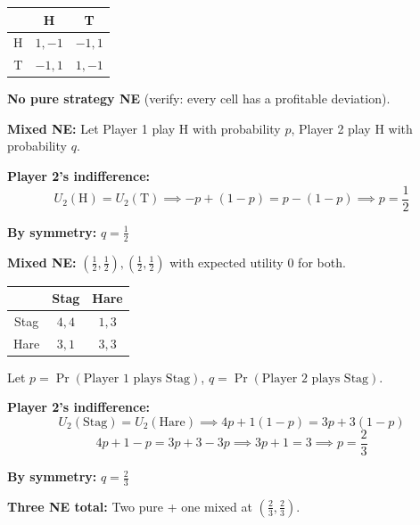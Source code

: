 \begin{exbox}
\begin{center}
\renewcommand{\arraystretch}{1.2}
\begin{tabular}{@{} c | c c @{}}
 & H & T \\
\midrule
H & $1, -1$ & $-1, 1$ \\
T & $-1, 1$ & $1, -1$ \\
\end{tabular}
\end{center}

\textbf{No pure strategy NE} (verify: every cell has a profitable deviation).

\textbf{Mixed NE:} Let Player 1 play H with probability $p$, Player 2 play H with probability $q$.

\textbf{Player 2's indifference:}
\[
U_2(\text{H}) = U_2(\text{T}) \implies -p + (1-p) = p - (1-p) \implies p = \frac{1}{2}
\]

\textbf{By symmetry:} $q = \frac{1}{2}$

\textbf{Mixed NE:} $\left(\frac{1}{2}, \frac{1}{2}\right), \left(\frac{1}{2}, \frac{1}{2}\right)$ with expected utility $0$ for both.
\end{exbox}

\begin{exbox}
\begin{center}
\renewcommand{\arraystretch}{1.2}
\begin{tabular}{@{} c | c c @{}}
 & Stag & Hare \\
\midrule
Stag & $4, 4$ & $1, 3$ \\
Hare & $3, 1$ & $3, 3$ \\
\end{tabular}
\end{center}

Let $p = \Pr(\text{Player 1 plays Stag})$, $q = \Pr(\text{Player 2 plays Stag})$.

\textbf{Player 2's indifference:}
\[
U_2(\text{Stag}) = U_2(\text{Hare}) \implies 4p + 1(1-p) = 3p + 3(1-p)
\]
\[
4p + 1 - p = 3p + 3 - 3p \implies 3p + 1 = 3 \implies p = \frac{2}{3}
\]

\textbf{By symmetry:} $q = \frac{2}{3}$

\textbf{Three NE total:} Two pure + one mixed at $\left(\frac{2}{3}, \frac{2}{3}\right)$.
\end{exbox}

